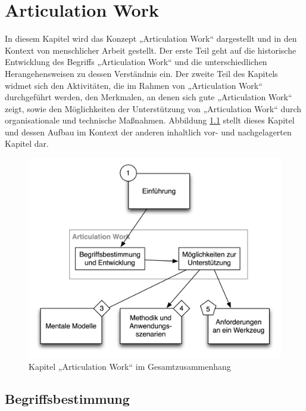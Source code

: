 
\chapter{Articulation Work} %
\label{cha:articulation_work}

In diesem Kapitel wird das Konzept „Articulation Work“ dargestellt und in den Kontext von menschlicher Arbeit gestellt. Der erste Teil geht auf die historische Entwicklung des Begriffs „Articulation Work“ und die unterschiedlichen Herangehensweisen zu dessen Verständnis ein. Der zweite Teil des Kapitels widmet sich den Aktivitäten, die im Rahmen von „Articulation Work“ durchgeführt werden, den Merkmalen, an denen sich gute „Articulation Work“ zeigt, sowie den Möglichkeiten der Unterstützung von „Articulation Work“ durch organisationale und technische Maßnahmen. Abbildung \ref{fig:img_Kontextgrafiken_k2} stellt dieses Kapitel und dessen Aufbau im Kontext der anderen inhaltlich vor- und nachgelagerten Kapitel dar.


\begin{figure}[htbp]
	\centering
		\includegraphics[scale=0.6]{img/Kontextgrafiken/k2.png}
	\caption{Kapitel „Articulation Work“ im Gesamtzusammenhang}
	\label{fig:img_Kontextgrafiken_k2}
\end{figure}

\section{Begriffsbestimmung} %
\label{sec:aw_begriffsbestimmung}

